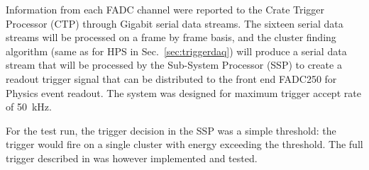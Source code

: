 Information from each FADC channel were reported to the Crate Trigger Processor (CTP) through Gigabit serial data streams. The sixteen serial data streams will be processed on a frame by frame basis, and the cluster finding algorithm (same as for HPS in Sec.~\ref{sec:triggerdaq}) will produce a serial data stream that will be processed by the Sub-System Processor (SSP) to create a readout trigger signal that can be distributed to the front end FADC250 for Physics event readout. The system was designed for maximum trigger accept rate of 50~kHz. 

For the test run, the trigger decision in the SSP was a simple threshold: the trigger would fire on a single cluster with energy exceeding the threshold. The full trigger described in \cite{HPS_tPROP} was however implemented and tested.